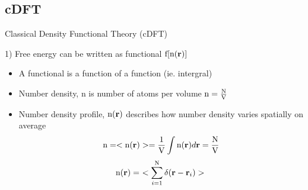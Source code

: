 \documentclass{beamer}
\renewcommand{\vec}[1]{\mathbf{#1}}
\begin{document}
\subsection*{cDFT}
\begin{frame}{Classical Density Functional Theory (cDFT)}
    \begin{block}{1) Free energy can be written as functional $\text f[\text{n}(\vec r)]$}  
       \begin{itemize}
          \item A functional is a function of a function (ie. intergral)
          \item Number density, n is number of atoms per volume $\text n=\frac{\text N}{\text V}$
          \item Number density profile, $\text n(\vec{r})$ describes how 
             number density varies spatially on average %
          \begin{displaymath} \text n=<\text n(\vec{r})>=\frac{1}{\text V}\int{\text n(\vec{r})}{d\vec{r}}=\frac{\text N}{\text V}\end{displaymath}
          \begin{displaymath}\text n(\vec r)=~<\sum_{i=1}^{\text N}\delta(\vec r - \vec r_i)>~\end{displaymath} 
        \end{itemize}
    \end{block}
\end{frame}  
  
\end{document}
